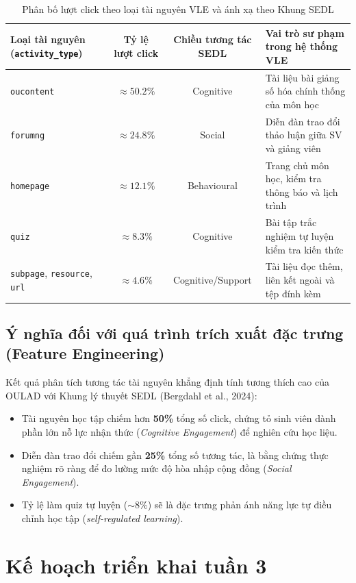 \documentclass[11pt,a4paper]{article}
\begin{document}
\begin{table}[H]
\centering
\small
\renewcommand{\arraystretch}{1.25}
\begin{tabularx}{\textwidth}{@{}l c c X@{}}
\toprule
\textbf{Loại tài nguyên (\texttt{activity\_type})} & \textbf{Tỷ lệ lượt click} & \textbf{Chiều tương tác SEDL} & \textbf{Vai trò sư phạm trong hệ thống VLE} \\
\midrule
\texttt{oucontent} & $\approx 50.2\%$ & Cognitive & Tài liệu bài giảng số hóa chính thống của môn học \\
\texttt{forumng} & $\approx 24.8\%$ & Social & Diễn đàn trao đổi thảo luận giữa SV và giảng viên \\
\texttt{homepage} & $\approx 12.1\%$ & Behavioural & Trang chủ môn học, kiểm tra thông báo và lịch trình \\
\texttt{quiz} & $\approx 8.3\%$ & Cognitive & Bài tập trắc nghiệm tự luyện kiểm tra kiến thức \\
\texttt{subpage}, \texttt{resource}, \texttt{url} & $\approx 4.6\%$ & Cognitive/Support & Tài liệu đọc thêm, liên kết ngoài và tệp đính kèm \\
\bottomrule
\end{tabularx}
\caption{Phân bố lượt click theo loại tài nguyên VLE và ánh xạ theo Khung SEDL}
\end{table}

\subsection{Ý nghĩa đối với quá trình trích xuất đặc trưng (Feature Engineering)}
Kết quả phân tích tương tác tài nguyên khẳng định tính tương thích cao của OULAD với Khung lý thuyết SEDL (Bergdahl et al., 2024):
\begin{itemize}
    \item Tài nguyên học tập chiếm hơn \textbf{50\%} tổng số click, chứng tỏ sinh viên dành phần lớn nỗ lực nhận thức (\textit{Cognitive Engagement}) để nghiên cứu học liệu.
    \item Diễn đàn trao đổi chiếm gần \textbf{25\%} tổng số tương tác, là bằng chứng thực nghiệm rõ ràng để đo lường mức độ hòa nhập cộng đồng (\textit{Social Engagement}).
    \item Tỷ lệ làm quiz tự luyện ($\sim 8\%$) sẽ là đặc trưng phản ánh năng lực tự điều chỉnh học tập (\textit{self-regulated learning}).
\end{itemize}

\newpage

\section{Kế hoạch triển khai tuần 3}
\end{document}
